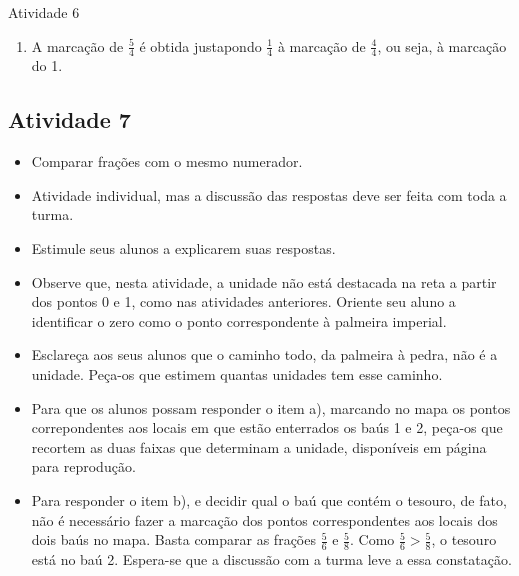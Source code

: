 \begin{multicols}{2}
\begin{resposta*}{Atividade 6}
\begin{enumerate} [\quad a)]
    \item       A marcação de       $\frac{5}{4}$       é obtida justapondo       $\frac{1}{4}$       à marcação de       $\frac{4}{4}$, ou seja, à marcação do 1.

    
 
    \end{enumerate} %
  
\end{resposta*}


\subsection{Atividade 7}

\begin{itemize} %
    \item       Comparar frações com o mesmo numerador.
\end{itemize} %
  
\begin{itemize} %
    \item       Atividade individual, mas a discussão das respostas deve ser feita com toda a turma.
    \item       Estimule seus alunos a explicarem suas respostas.
    \item       Observe que, nesta atividade, a unidade não está destacada na reta a partir dos pontos 0 e 1, como nas atividades anteriores. Oriente seu aluno a identificar o zero como o ponto correspondente à palmeira imperial. 
    \item       Esclareça aos seus alunos que o caminho todo, da palmeira à pedra, não é a unidade. Peça-os que estimem quantas unidades tem esse caminho.
    \item       Para que os alunos possam responder o item a), marcando no mapa os pontos correpondentes aos locais em que estão enterrados os baús 1 e 2, peça-os que recortem as duas faixas que determinam a unidade, disponíveis em página para reprodução.  
    \item       Para responder o item b), e decidir qual o baú que contém o tesouro, de fato, não é necessário fazer a marcação dos pontos correspondentes aos locais dos dois baús no mapa. Basta comparar as frações       $\frac{5}{6}$       e       $\frac{5}{8}$. Como        $\frac{5}{6}  > \frac{5}{8}$, o tesouro está no baú 2.  Espera-se que a discussão com a turma leve a essa constatação. 
\end{itemize} %


\end{multicols}
